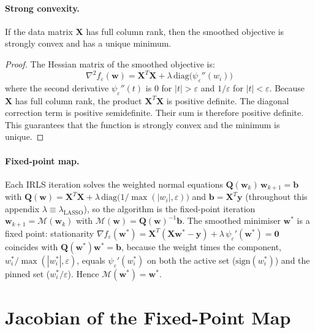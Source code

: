 \paragraph{Strong convexity.}
\begin{proposition}
\label{app:prop:strong_convex}
If the data matrix $\mathbf{X}$ has full column rank, then the smoothed objective is strongly convex and has a unique minimum.
\end{proposition}
\begin{proof}
The Hessian matrix of the smoothed objective is:
\begin{equation}
    \nabla^2 f_\varepsilon(\mathbf{w})
    = \mathbf{X}^T\mathbf{X}
    + \lambda\,\mathrm{diag}\bigl(\psi_\varepsilon''(w_i)\bigr)
    \label{app:eq:hessian_fe}
\end{equation}
where the second derivative $\psi_\varepsilon''(t)$ is $0$ for $|t|>\varepsilon$ and $1/\varepsilon$ for $|t|<\varepsilon$.
Because $\mathbf{X}$ has full column rank, the product $\mathbf{X}^T\mathbf{X}$ is positive definite. The diagonal correction term is positive semidefinite. Their sum is therefore positive definite. This guarantees that the function is strongly convex and the minimum is unique.
\end{proof}

\paragraph{Fixed-point map.}
Each IRLS iteration solves the weighted normal equations
$\mathbf{Q}(\mathbf{w}_k)\,\mathbf{w}_{k+1}=\mathbf{b}$ with
$\mathbf{Q}(\mathbf{w})=\mathbf{X}^T\mathbf{X}+\lambda\,\mathrm{diag}\!\bigl(1/\max(|w_i|,\varepsilon)\bigr)$
and $\mathbf{b}=\mathbf{X}^T\mathbf{y}$ (throughout this appendix $\lambda\equiv\lambda_{\text{LASSO}}$),
so the algorithm is the fixed-point iteration $\mathbf{w}_{k+1}=\mathcal{M}(\mathbf{w}_k)$ with
$\mathcal{M}(\mathbf{w})=\mathbf{Q}(\mathbf{w})^{-1}\mathbf{b}$.
The smoothed minimiser $\mathbf{w}^*$ is a fixed point: stationarity
$\nabla f_\varepsilon(\mathbf{w}^*)=\mathbf{X}^T(\mathbf{X}\mathbf{w}^*-\mathbf{y})+\lambda\,\psi_\varepsilon'(\mathbf{w}^*)=\mathbf{0}$
coincides with $\mathbf{Q}(\mathbf{w}^*)\mathbf{w}^*=\mathbf{b}$, because the weight times the
component, $w^*_i/\max(|w^*_i|,\varepsilon)$, equals $\psi_\varepsilon'(w^*_i)$ on both the
active set ($\mathrm{sign}(w^*_i)$) and the pinned set ($w^*_i/\varepsilon$). Hence
$\mathcal{M}(\mathbf{w}^*)=\mathbf{w}^*$.

\section{Jacobian of the Fixed-Point Map}
\label{app:sec:jacobian}

